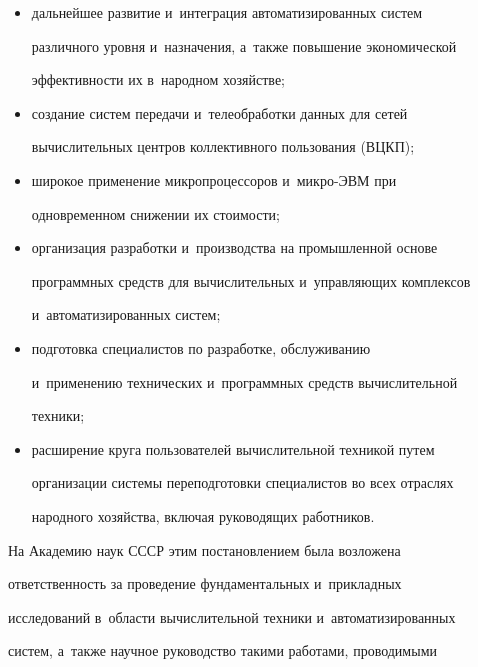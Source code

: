 \begin{itemize}
   \item дальнейшее развитие и~интеграция автоматизированных сис\-тем 

различного уров\-ня и~назначения, а~так\-же повышение экономической  

эф\-фек\-тив\-ности их в~народном хозяйстве;\\[-13.5pt]

   \item создание сис\-тем передачи и~телеобработки данных для сетей 

вы\-чис\-ли\-тель\-ных цент\-ров коллективного пользования (ВЦКП);\\[-13.5pt]

   \item широкое применение микропроцессоров и~мик\-ро-ЭВМ при 

одновременном снижении их сто\-и\-мости;\\[-13.5pt]

   \item организация разработки и~производства на промышленной основе 

про\-грам\-мных средств для вы\-чис\-ли\-тель\-ных и~управ\-ля\-ющих комплексов 

и~автоматизированных сис\-тем;\\[-13.5pt]

   \item подготовка специалистов по разработке, обслуживанию 

и~применению технических и~программных средств вы\-чис\-ли\-тель\-ной 

техники;\\[-13.5pt]

   \item расширение круга пользователей вы\-чис\-ли\-тель\-ной техникой путем 

организации сис\-те\-мы переподготовки специалистов во всех отраслях 

народного хозяйства, включая руководящих работников.

   \end{itemize}

   

   На Академию наук СССР этим постановлением была возложена 

ответственность за проведение фундаментальных и~прикладных 

исследований в~об\-ласти вы\-чис\-ли\-тель\-ной техники и~автоматизированных 

систем, а~так\-же научное руководство такими работами, проводимыми 


